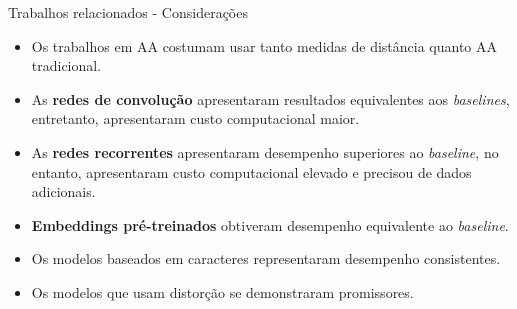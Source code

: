 \begin{frame}{Trabalhos relacionados - Considerações}

\begin{itemize}
	\item Os trabalhos em AA costumam usar tanto medidas de distância quanto AA tradicional.
	\item As {\bf redes de convolução} apresentaram resultados equivalentes aos {\it baselines}, entretanto, apresentaram custo computacional maior.
	\item As {\bf redes recorrentes} apresentaram desempenho superiores ao {\it baseline}, no entanto, apresentaram custo computacional elevado e precisou de dados adicionais.
	\item {\bf Embeddings pré-treinados} obtiveram desempenho equivalente ao {\it baseline}.
	\item Os modelos baseados em caracteres representaram desempenho consistentes.
	\item Os modelos que usam distorção se demonstraram promissores.
	
\end{itemize}

\end{frame}


